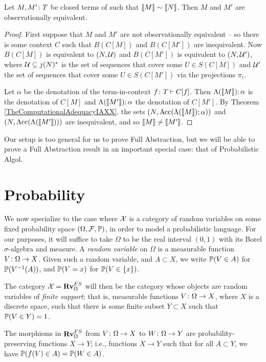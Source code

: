 \documentclass{report}[11pt]
\begin{document}
\begin{theorem}
  Let $M,M'\colon T$ be closed terms of \IAXX such that $\left\llbracket M\right\rrbracket\sim\left\llbracket N\right\rrbracket$.
  Then $M$ and $M'$ are observationally equivalent.
\end{theorem}
\begin{proof}
  First suppose that $M$ and $M'$ are not observationally equivalent -- so there is some context $C$ such that $B(C[M])$ and $B(C[M'])$ are inequivalent.
  Now $B(C[M])$ is equivalent to $(N,\mathcal U)$ and $B(C[M'])$ is equivalent to $(N,\mathcal U')$, where $\mathcal U\subseteq j(N)^*$ is the set of sequences that cover some $U\in S(C[M])$ and $\mathcal U'$ the set of sequences that cover some $U\in S(C[M'])$ via the projections $\pi_i$.

  Let $\alpha$ be the denotation of the term-in-context $f\colon T \mathbin{\vdash} C[f]$.  
  Then $\Lambda(\left\llbracket M\right\rrbracket);\alpha$ is the denotation of $C[M]$ and $\Lambda(\left\llbracket M'\right\rrbracket);\alpha$ the denotation of $C[M']$.  
  By Theorem \ref{TheComputationalAdequacyIAXX}, the sets $(N,\operatorname{Acc}(\Lambda(\left\llbracket M\right\rrbracket);\alpha))$ and $(N,\operatorname{Acc}(\Lambda(\left\llbracket M'\right\rrbracket)))$ are inequivalent, and so $\left\llbracket M\right\rrbracket \not\sim\left\llbracket M'\right\rrbracket$.
\end{proof}

Our setup is too general for us to prove Full Abstraction, but we will be able to prove a Full Abstraction result in an important special case: that of Probabilistic Algol.

\section{Probability}

We now specialize to the case where $\mathcal X$ is a category of random variables on some fixed probability space $(\Omega,\mathcal F,\mathbb{P})$, in order to model a probabilistic language.
For our purposes, it will suffice to take $\Omega$ to be the real interval $(0,1)$ with its Borel $\sigma$-algebra and measure.
A \emph{random variable} on $\Omega$ is a measurable function $V \colon \Omega \to X$.  
Given such a random variable, and $A\subset X$, we write $\mathbb{P}(V \in A)$ for $\mathbb{P}(V^{-1}(A))$, and $\mathbb{P}(V = x)$ for $\mathbb{P}(V \in \{x\})$.

The category $\mathcal X = {\normalfont\textbf{Rv}}_\Omega^{FS}$ will then be the category whose objects are random variables of \emph{finite support}; that is, measurable functions $V\colon\Omega \to X$, where $X$ is a discrete space, such that there is some finite subset $Y\subset X$ such that $\mathbb{P}(V\in Y) = 1$.

The morphisms in ${\normalfont\textbf{Rv}}_\Omega^{FS}$ from $V\colon \Omega \to X$ to $W \colon \Omega \to Y$ are probability-preserving functions $X \to Y$; i.e., functions $X \to Y$ such that for all $A \subset Y$, we have $\mathbb{P}(f(V) \in A) = \mathbb{P}(W \in A)$.
\end{document}
